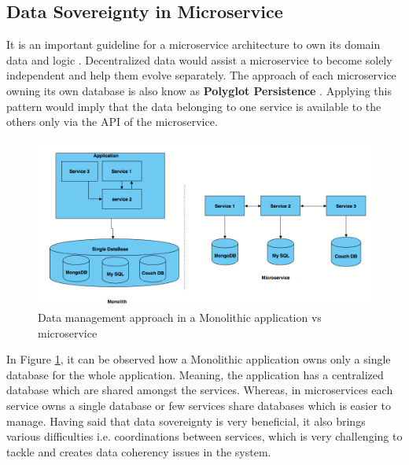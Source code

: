     \newpage
    \subsection{Data Sovereignty in Microservice}
    \label{subsection:dataSovereignty}
    It is an important guideline for a microservice architecture to own its domain data and 
    logic \cite[p.~29]{Torre2017}. Decentralized data would assist a microservice
    to become solely independent and help them evolve separately. The approach of each microservice owning its own database is also
    know as \textbf{Polyglot Persistence} \cite{Polyglot}. Applying this pattern would imply that the
    data belonging to one service is available to the others only via the API of the microservice.

    \begin{figure}[H]
        \centering \includegraphics[scale=0.4]{grafiken/polyglot.png}
        \caption{Data management approach in a Monolithic application vs microservice \cite{FowlerMartin}}
        \label{fig:polyglot}
    \end{figure}
    
   In Figure \ref{fig:polyglot}, it can be observed how a Monolithic application owns only a single database for the whole application. Meaning,
   the application has a centralized database which are shared amongst the services. Whereas, in microservices each service owns
   a single database or few services share databases which is easier to manage. Having said that data sovereignty is very beneficial, it also brings various difficulties
   i.e. coordinations between services, which is very challenging to tackle and creates data coherency issues in the system. 




